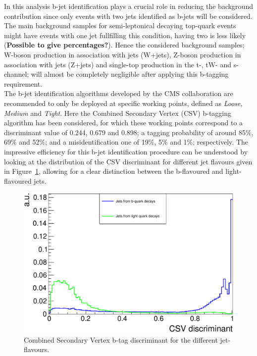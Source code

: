 In this analysis b-jet identification plays a crucial role in reducing the background contribution since only events with two jets identified as b-jets will be considered. The main background samples for semi-leptonical decaying top-quark events might have events with one jet fullfilling this condition, having two  is less likely (\textbf{Possible to give percentages?}). Hence the considered background samples; W-boson production in association with jets (W+jets), Z-boson production in association with jets (Z+jets) and single-top production in the t-, tW- and s-channel; will almost be completely negligible after applying this b-tagging requirement.
\\

The b-jet identification algorithms developed by the CMS collaboration are recommended to only be deployed at specific working points, defined as \textit{Loose}, \textit{Medium} and \textit{Tight}. 
Here the Combined Secondary Vertex (CSV) b-tagging algorithm has been considered, for which these working points correspond to a discriminant value of 0.244, 0.679 and 0.898; a tagging probability of around 85$\%$, 69$\%$ and 52$\%$; and a misidentification one of 19$\%$, 5$\%$ and 1$\%$; respectively.
The impressive efficiency for this b-jet identification procedure can be understood by looking at the distribution of the CSV discriminant for different jet flavours given in Figure~\ref{fig::CSVDiscr}, allowing for a clear distinction between the b-flavoured and light-flavoured jets.
\begin{figure}[h!t]
 \centering
 \includegraphics[width = 0.85 \textwidth]{Chapters/Chapter4_EvtSel/Figures/CSVDiscr_LightAndBJets.pdf}
 \caption{Combined Secondary Vertex b-tag discriminant for the different jet-flavours.} \label{fig::CSVDiscr}
\end{figure}

